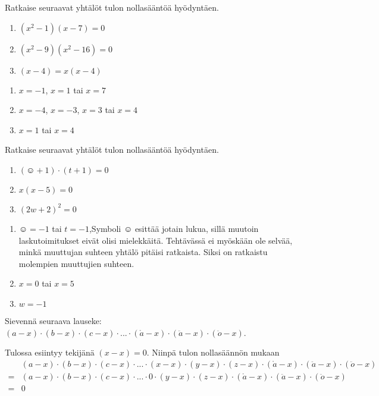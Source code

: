 \begin{tehtava}
    Ratkaise seuraavat yhtälöt tulon nollasääntöä hyödyntäen.
    \begin{enumerate}
        \item $(x^2-1)(x-7)=0$
        \item $(x^2-9)(x^2-16)=0$
        \item $(x-4)=x(x-4)$
    \end{enumerate}
    \begin{vastaus}
        \begin{enumerate}
            \item $x=-1$, $x=1$ tai $x=7$
            \item $x=-4$, $x=-3$, $x=3$ tai $x=4$
            \item $x=1$ tai $x=4$
        \end{enumerate}
    \end{vastaus}
\end{tehtava}

\begin{tehtava}
    Ratkaise seuraavat yhtälöt tulon nollasääntöä hyödyntäen.
    \begin{enumerate}
        \item $(\smiley{}+1)\cdot (t+1)=0$
        \item $x(x-5)=0$
        \item $(2w+2)^2=0$
    \end{enumerate}
    \begin{vastaus}
        \begin{enumerate}
            \item $\smiley{}=-1$ tai $t=-1$,\qquad  Symboli $\smiley{}$ esittää jotain lukua, sillä muutoin laskutoimitukset eivät olisi mielekkäitä. Tehtävässä ei myöskään ole selvää, minkä muuttujan suhteen yhtälö pitäisi ratkaista. Siksi on ratkaistu molempien muuttujien suhteen.
            \item $x=0$ tai $x=5$
            \item $w=-1$
        \end{enumerate}
    \end{vastaus}
\end{tehtava}

\begin{tehtava}
    Sievennä seuraava lauseke: $(a-x)\cdot(b-x)\cdot(c-x)\cdot...\cdot(\mathring{a}-x)\cdot(\ddot{a}-x)\cdot(\ddot{o}-x)$.
    \begin{vastaus}
        Tulossa esiintyy tekijänä $(x-x)=0$. Niinpä tulon nollasäännön mukaan
        \begin{align*}
            &(a-x)\cdot(b-x)\cdot(c-x)\cdot...\cdot(x-x)\cdot(y-x)\cdot(z-x)\cdot(\mathring{a}-x)\cdot(\ddot{a}-x)\cdot(\ddot{o}-x) \\
            =&(a-x)\cdot(b-x)\cdot(c-x)\cdot...\cdot 0\cdot(y-x)\cdot(z-x)\cdot(\mathring{a}-x)\cdot(\ddot{a}-x)\cdot(\ddot{o}-x) \\
            =&0
        \end{align*}
    \end{vastaus}
\end{tehtava}

